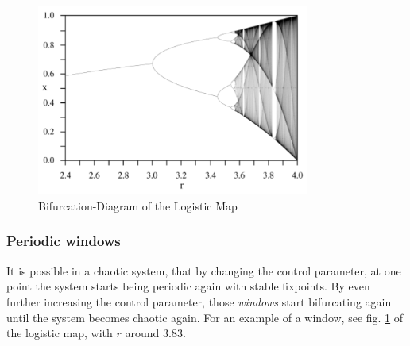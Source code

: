 \begin{figure}[H]
\centering \includegraphics[width=0.8\textwidth]{Bilder/logmap.png}
\caption{Bifurcation-Diagram of the Logistic Map}
\label{bifurcation-diagram-of-the-logistic-map}
\end{figure}

\subsubsection{Periodic windows}

It is possible in a chaotic system, that by changing the control parameter, at one point the system starts being periodic again with stable fixpoints. By even further increasing the control parameter, those \emph{windows} start bifurcating again until the system becomes chaotic again. For an example of a window, see fig. \ref{bifurcation-diagram-of-the-logistic-map} of the logistic map, with $r$ around 3.83.


